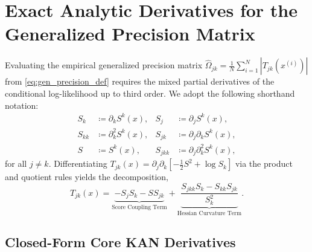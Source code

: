 \documentclass[11pt,a4paper]{article}
\theoremstyle{plain}
\theoremstyle{definition}
\theoremstyle{remark}
\begin{document}
\section{Exact Analytic Derivatives for the Generalized Precision Matrix}
\label{sec:analytic_precision}

Evaluating the empirical generalized precision matrix $\widehat{\Omega}_{jk} = \frac{1}{N} \sum_{i=1}^N |T_{jk}(x^{(i)})|$ from \eqref{eq:gen_precision_def} requires the mixed partial derivatives of the conditional log-likelihood up to third order. We adopt the following shorthand notation:
\begin{align}
    S_k &\coloneqq \partial_k S^k(x), & S_j &\coloneqq \partial_j S^k(x), \label{eq:notation_first_derivs} \\
    S_{kk} &\coloneqq \partial_k^2 S^k(x), & S_{jk} &\coloneqq \partial_j \partial_k S^k(x), \label{eq:notation_second_derivs} \\
    S &\coloneqq S^k(x), & S_{jkk} &\coloneqq \partial_j \partial_k^2 S^k(x), \label{eq:notation_third_derivs}
\end{align}
for all $j \neq k$.
Differentiating $T_{jk}(x) = \partial_j \partial_k [-\frac{1}{2} S^2 + \log S_k]$ via the product and quotient rules yields the decomposition,
\begin{equation}
    T_{jk}(x) = \underbrace{-S_j S_k - S S_{jk}}_{\text{Score Coupling Term}} + \underbrace{\frac{S_{jkk} S_k - S_{kk} S_{jk}}{S_k^2}}_{\text{Hessian Curvature Term}}.
    \label{eq:precision_analytic_formula}
\end{equation}

\subsection{Closed-Form Core KAN Derivatives}
\label{subsec:core_kan_derivatives}
\end{document}
